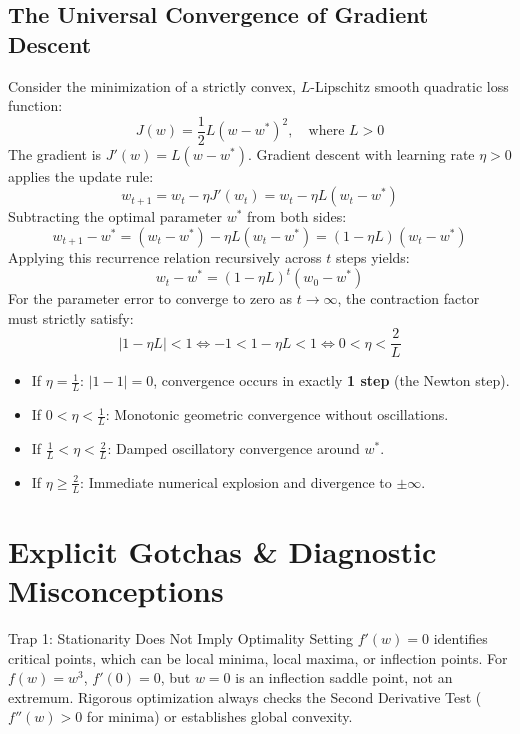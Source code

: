 \subsection{The Universal Convergence of Gradient Descent}
Consider the minimization of a strictly convex, $L$-Lipschitz smooth quadratic loss function:
\begin{equation}
J(w) = \frac{1}{2} L (w - w^*)^2, \quad \text{where } L > 0
\end{equation}
The gradient is $J'(w) = L(w - w^*)$. Gradient descent with learning rate $\eta > 0$ applies the update rule:
\begin{equation}
w_{t+1} = w_t - \eta J'(w_t) = w_t - \eta L (w_t - w^*)
\end{equation}
Subtracting the optimal parameter $w^*$ from both sides:
\begin{equation}
w_{t+1} - w^* = (w_t - w^*) - \eta L (w_t - w^*) = (1 - \eta L)(w_t - w^*)
\end{equation}
Applying this recurrence relation recursively across $t$ steps yields:
\begin{equation}
w_t - w^* = (1 - \eta L)^t (w_0 - w^*)
\end{equation}
For the parameter error to converge to zero as $t \to \infty$, the contraction factor must strictly satisfy:
\begin{equation}
|1 - \eta L| < 1 \iff -1 < 1 - \eta L < 1 \iff 0 < \eta < \frac{2}{L}
\end{equation}
\begin{itemize}
    \item If $\eta = \frac{1}{L}$: $|1 - 1| = 0$, convergence occurs in exactly \textbf{1 step} (the Newton step).
    \item If $0 < \eta < \frac{1}{L}$: Monotonic geometric convergence without oscillations.
    \item If $\frac{1}{L} < \eta < \frac{2}{L}$: Damped oscillatory convergence around $w^*$.
    \item If $\eta \ge \frac{2}{L}$: Immediate numerical explosion and divergence to $\pm \infty$.
\end{itemize}

\section{Explicit Gotchas \& Diagnostic Misconceptions}

\begin{trapbox}{Trap 1: Stationarity Does Not Imply Optimality}
Setting $f'(w) = 0$ identifies critical points, which can be local minima, local maxima, or inflection points. For $f(w) = w^3$, $f'(0) = 0$, but $w=0$ is an inflection saddle point, not an extremum. Rigorous optimization always checks the Second Derivative Test ($f''(w) > 0$ for minima) or establishes global convexity.
\end{trapbox}

